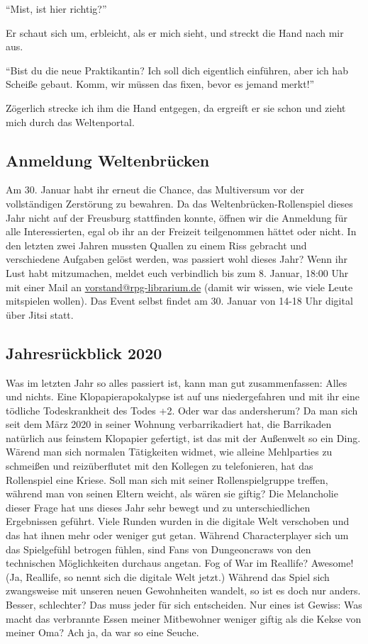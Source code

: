 \documentclass[final]{multiversum}
\begin{document}
\enquote{Mist, ist hier richtig?}

Er schaut sich um, erbleicht, als er mich sieht, und streckt die Hand nach mir aus.

\enquote{Bist du die neue Praktikantin? Ich soll dich eigentlich einführen, aber ich hab Scheiße gebaut. 
Komm, wir müssen das fixen, bevor es jemand merkt!}

Zögerlich strecke ich ihm die Hand entgegen, da ergreift er sie schon und zieht mich durch das Weltenportal.

\subsection{Anmeldung Weltenbrücken}
Am 30. Januar habt ihr erneut die Chance, das Multiversum vor der vollständigen Zerstörung zu bewahren. 
Da das Weltenbrücken-Rollenspiel dieses Jahr nicht auf der Freusburg stattfinden konnte, öffnen wir die Anmeldung für alle Interessierten, egal ob ihr an der Freizeit teilgenommen hättet oder nicht. 
In den letzten zwei Jahren mussten Quallen zu einem Riss gebracht und verschiedene Aufgaben gelöst werden, was passiert wohl dieses Jahr?
Wenn ihr Lust habt mitzumachen, meldet euch verbindlich bis zum 8. Januar, 18:00 Uhr mit einer Mail an \href{mailto:vorstand@rpg-librarium.de}{vorstand@rpg-librarium.de} (damit wir wissen, wie viele Leute mitspielen wollen).
Das Event selbst findet am 30. Januar von 14-18 Uhr digital über Jitsi statt.

\subsection{Jahresrückblick 2020}
Was im letzten Jahr so alles passiert ist, kann man gut zusammenfassen: Alles und nichts.
Eine Klopapierapokalypse ist auf uns niedergefahren und mit ihr eine tödliche Todeskrankheit des Todes +2.
Oder war das andersherum?
Da man sich seit dem März 2020 in seiner Wohnung verbarrikadiert hat, die Barrikaden natürlich aus feinstem Klopapier gefertigt, ist das mit der Außenwelt so ein Ding.
Wärend man sich normalen Tätigkeiten widmet, wie alleine Mehlparties zu schmeißen und reizüberflutet mit den Kollegen zu telefonieren, hat das Rollenspiel eine Kriese.
Soll man sich mit seiner Rollenspielgruppe treffen, während man von seinen Eltern weicht, als wären sie giftig?
Die Melancholie dieser Frage hat uns dieses Jahr sehr bewegt und zu unterschiedlichen Ergebnissen geführt.
Viele Runden wurden in die digitale Welt verschoben und das hat ihnen mehr oder weniger gut getan.
Während Characterplayer sich um das Spielgefühl betrogen fühlen, sind Fans von Dungeoncraws von den technischen Möglichkeiten durchaus angetan.
Fog of War im Reallife? Awesome! (Ja, Reallife, so nennt sich die digitale Welt jetzt.)
Während das Spiel sich zwangsweise mit unseren neuen Gewohnheiten wandelt, so ist es doch nur anders.
Besser, schlechter? Das muss jeder für sich entscheiden.
Nur eines ist Gewiss:
Was macht das verbrannte Essen meiner Mitbewohner weniger giftig als die Kekse von meiner Oma?
Ach ja, da war so eine Seuche.
\end{document}
